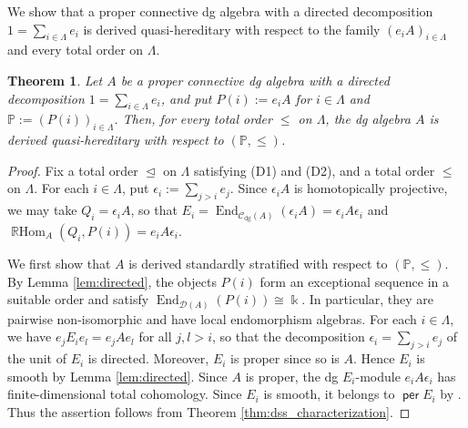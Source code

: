 \documentclass[a4paper,reqno,11pt]{amsart}
\numberwithin{equation}{section}
\newtheorem{theorem}{Theorem}[section]
\theoremstyle{definition}
\newcommand{\C}{\mathcal{C}}
\newcommand{\D}{\mathcal{D}}
\newcommand{\PP}{\mathbb{P}}
\newcommand{\e}{\epsilon}
\newcommand{\kk}{\Bbbk}
\DeclareMathOperator{\per}{\mathsf{per}}
\DeclareMathOperator{\End}{End}
\DeclareMathOperator{\RHom}{\mathbb{R}Hom}
\newcommand{\dgmod}{\C_{\mathrm{dg}}}
\begin{document}
We show that a proper connective dg algebra with a directed decomposition $1=\sum_{i\in\Lambda}e_{i}$ is derived quasi-hereditary with respect to the family $(e_{i}A)_{i\in\Lambda}$ and every total order on $\Lambda$.

\begin{theorem}\label{thm:directed}
Let $A$ be a proper connective dg algebra with a directed decomposition $1=\sum_{i\in\Lambda}e_{i}$, and put $P(i):=e_{i}A$ for $i\in\Lambda$ and $\PP:=(P(i))_{i\in\Lambda}$.
Then, for every total order $\leq$ on $\Lambda$, the dg algebra $A$ is derived quasi-hereditary with respect to $(\PP,\leq)$.
\end{theorem}
\begin{proof}
Fix a total order $\trianglelefteq$ on $\Lambda$ satisfying (D1) and (D2), and a total order $\leq$ on $\Lambda$.
For each $i\in\Lambda$, put $\e_{i}:=\sum_{j>i}e_{j}$.
Since $\e_{i}A$ is homotopically projective, we may take $Q_{i}=\e_{i}A$, so that $E_{i}=\End_{\dgmod(A)}(\e_{i}A)=\e_{i}A\e_{i}$ and $\RHom_{A}(Q_{i},P(i))=e_{i}A\e_{i}$.

We first show that $A$ is derived standardly stratified with respect to $(\PP,\leq)$.
By Lemma \ref{lem:directed}, the objects $P(i)$ form an exceptional sequence in a suitable order and satisfy $\End_{\D(A)}(P(i))\cong\kk$.
In particular, they are pairwise non-isomorphic and have local endomorphism algebras.
For each $i\in\Lambda$, we have $e_{j}E_{i}e_{l}=e_{j}Ae_{l}$ for all $j,l>i$, so that the decomposition $\e_{i}=\sum_{j>i}e_{j}$ of the unit of $E_{i}$ is directed.
Moreover, $E_{i}$ is proper since so is $A$.
Hence $E_{i}$ is smooth by Lemma \ref{lem:directed}.
Since $A$ is proper, the dg $E_{i}$-module $e_{i}A\e_{i}$ has finite-dimensional total cohomology.
Since $E_{i}$ is smooth, it belongs to $\per E_{i}$ by \cite[Lemma 3.8(ii)]{KS25}.
Thus the assertion follows from Theorem \ref{thm:dss_characterization}.


\end{proof}
\end{document}
